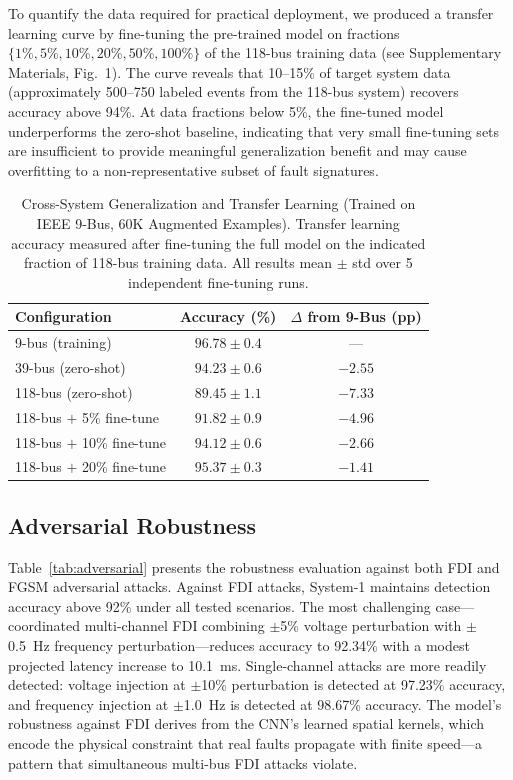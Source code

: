 \documentclass[journal]{IEEEtran}
\begin{document}
To quantify the data required for practical deployment, we produced a transfer learning curve by fine-tuning the pre-trained model on fractions $\{1\%, 5\%, 10\%, 20\%, 50\%, 100\%\}$ of the 118-bus training data (see Supplementary Materials, Fig.~1). The curve reveals that 10--15\% of target system data (approximately 500--750 labeled events from the 118-bus system) recovers accuracy above 94\%. At data fractions below 5\%, the fine-tuned model underperforms the zero-shot baseline, indicating that very small fine-tuning sets are insufficient to provide meaningful generalization benefit and may cause overfitting to a non-representative subset of fault signatures.

\begin{table}[!t]
\centering
\caption{Cross-System Generalization and Transfer Learning (Trained on IEEE 9-Bus, 60K Augmented Examples). Transfer learning accuracy measured after fine-tuning the full model on the indicated fraction of 118-bus training data. All results mean $\pm$ std over 5 independent fine-tuning runs.}
\label{tab:scalability}
\begin{tabular}{lcc}
\toprule
\textbf{Configuration} & \textbf{Accuracy (\%)} & \textbf{$\Delta$ from 9-Bus (pp)} \\
\midrule
9-bus (training)                   & $96.78 \pm 0.4$ & --- \\
39-bus (zero-shot)                 & $94.23 \pm 0.6$ & $-2.55$ \\
118-bus (zero-shot)                & $89.45 \pm 1.1$ & $-7.33$ \\
118-bus $+$ 5\% fine-tune          & $91.82 \pm 0.9$ & $-4.96$ \\
118-bus $+$ 10\% fine-tune         & $94.12 \pm 0.6$ & $-2.66$ \\
118-bus $+$ 20\% fine-tune         & $95.37 \pm 0.3$ & $-1.41$ \\
\bottomrule
\end{tabular}
\end{table}

\subsection{Adversarial Robustness}

Table~\ref{tab:adversarial} presents the robustness evaluation against both FDI and FGSM adversarial attacks. Against FDI attacks, System-1 maintains detection accuracy above 92\% under all tested scenarios. The most challenging case---coordinated multi-channel FDI combining $\pm$5\% voltage perturbation with $\pm$0.5~Hz frequency perturbation---reduces accuracy to 92.34\% with a modest projected latency increase to 10.1~ms. Single-channel attacks are more readily detected: voltage injection at $\pm$10\% perturbation is detected at 97.23\% accuracy, and frequency injection at $\pm$1.0~Hz is detected at 98.67\% accuracy. The model's robustness against FDI derives from the CNN's learned spatial kernels, which encode the physical constraint that real faults propagate with finite speed---a pattern that simultaneous multi-bus FDI attacks violate.
\end{document}
